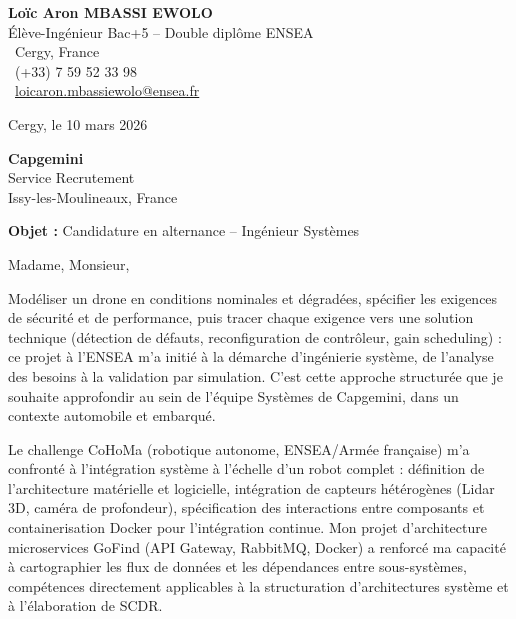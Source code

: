 \documentclass[a4paper,11pt]{article}
\begin{document}
\noindent
\begin{minipage}[t]{0.5\textwidth}
    \textbf{Loïc Aron MBASSI EWOLO}\\
    Élève-Ingénieur Bac+5 -- Double diplôme ENSEA\\[3pt]
    \faMapMarker\ Cergy, France\\
    \faPhone\ (+33) 7 59 52 33 98\\
    \faEnvelope\ \href{mailto:loicaron.mbassiewolo@ensea.fr}{loicaron.mbassiewolo@ensea.fr}
\end{minipage}
\hfill
\begin{minipage}[t]{0.4\textwidth}
    \raggedleft
    Cergy, le 10 mars 2026
\end{minipage}

\vspace{1.2cm}

\hfill
\begin{minipage}[t]{0.5\textwidth}
    \raggedleft
    \textbf{Capgemini}\\
    Service Recrutement\\
    Issy-les-Moulineaux, France
\end{minipage}

\vspace{1cm}

\noindent\textbf{Objet :} Candidature en alternance -- Ingénieur Systèmes

\vspace{0.8cm}

Madame, Monsieur,

Modéliser un drone en conditions nominales et dégradées, spécifier les exigences de sécurité et de performance, puis tracer chaque exigence vers une solution technique (détection de défauts, reconfiguration de contrôleur, gain scheduling) : ce projet à l'ENSEA m'a initié à la démarche d'ingénierie système, de l'analyse des besoins à la validation par simulation. C'est cette approche structurée que je souhaite approfondir au sein de l'équipe Systèmes de Capgemini, dans un contexte automobile et embarqué.

Le challenge CoHoMa (robotique autonome, ENSEA/Armée française) m'a confronté à l'intégration système à l'échelle d'un robot complet : définition de l'architecture matérielle et logicielle, intégration de capteurs hétérogènes (Lidar 3D, caméra de profondeur), spécification des interactions entre composants et containerisation Docker pour l'intégration continue. Mon projet d'architecture microservices GoFind (API Gateway, RabbitMQ, Docker) a renforcé ma capacité à cartographier les flux de données et les dépendances entre sous-systèmes, compétences directement applicables à la structuration d'architectures système et à l'élaboration de SCDR.
\end{document}
